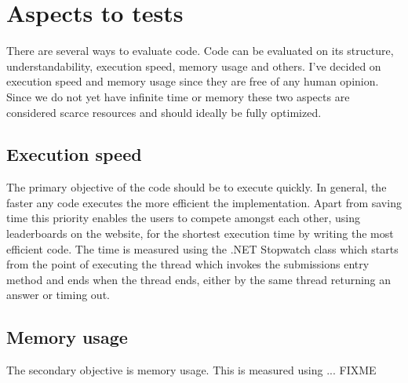 \section{Aspects to tests}
There are several ways to evaluate code. Code can be evaluated on its structure, understandability, execution speed, memory usage and others. I've decided on execution speed and memory usage since they are free of any human opinion. Since we do not yet have infinite time or memory these two aspects are considered scarce resources and should ideally be fully optimized.

\subsection{Execution speed}
The primary objective of the code should be to execute quickly. In general, the faster any code executes the more efficient the implementation. Apart from saving time this priority enables the users to compete amongst each other, using leaderboards on the website, for the shortest execution time by writing the most efficient code. 
The time is measured using the .NET Stopwatch class \cite{Stopwatch} which starts from the point of executing the thread which invokes the submissions entry method and ends when the thread ends, either by the same thread returning an answer or timing out. 


\subsection{Memory usage}
The secondary objective is memory usage. This is measured using ... FIXME